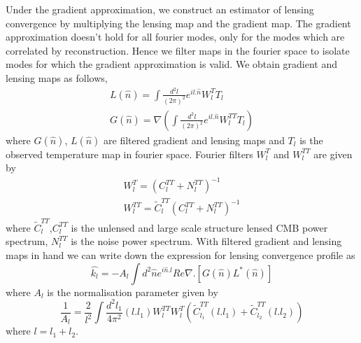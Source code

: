  Under the gradient approximation, we construct an estimator of lensing convergence by multiplying the lensing map and the gradient map.
The gradient approximation doesn't hold for all fourier modes, only for the modes which are correlated by reconstruction.
Hence we filter maps in the fourier space to isolate modes for which the gradient approximation is valid.
 We obtain gradient and lensing maps as follows,
  \begin{eqnarray}
  L(\hat{n}) = \int \frac{d^{2}l}{(2\pi)^{2}} e^{il .\hat{n}} W^{T}_{l} T_{l}\\
  G(\hat{n}) = \nabla (\int\frac{d^{2}l}{(2\pi)^{2}} e^{il .\hat{n}} W^{TT}_{l} T_{l}   )
  \end{eqnarray}
  where $G(\hat{n})$, $L(\hat{n})$ are filtered gradient and lensing maps and $T_{l}$ is the observed temperature map in fourier space.  
 Fourier filters $W^{T}_{l}$ and $W^{TT}_{l}$ are given by 
 \begin{eqnarray}
 W^{T}_{l} = (C^{TT}_{l} + N^{TT}_{l})^{-1}\\
 W^{TT}_{l} =  \widetilde{C}^{TT}_{l}(C^{TT}_{l} + N^{TT}_{l})^{-1}
 \end{eqnarray}
 where  $\widetilde{C}^{TT}_{l}$,$C^{TT}_{l} $  is the unlensed and large scale structure lensed CMB power spectrum, $ N^{TT}_{l}$ is the noise power spectrum.
 With filtered gradient and lensing maps in hand we can write down the expression for lensing convergence profile as 
 \begin{equation}
 \hat{k_{l}} = -A_{l} \int d^{2} \hat{n} e^{i\hat{n}.l} Re{\nabla .[G(\hat{n}) L^{*}(\hat{n})]}
 \end{equation}
 where $A_{l}$ is the normalisation parameter given by
 \begin{equation}
 \frac{1}{A_{l}} = \frac{2}{l^{2}} \int \frac{d^{2}l_{1}}{4\pi^{2}} (l.l_{1}) W^{TT}_{l} W^{T}_{l} (\tilde{C}^{TT}_{l_{1}}(l.l_{1}) + \tilde{C}^{TT}_{l_{2}}(l.l_{2}))
 \end{equation}
 where $l = l_{1}  + l_{2}$. 
